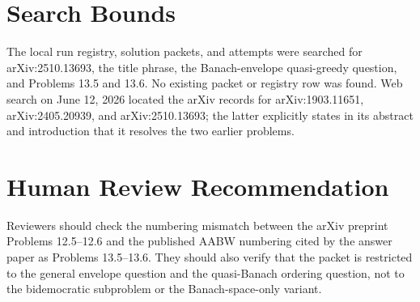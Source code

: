 \documentclass[11pt]{article}
\begin{document}
\section*{Search Bounds}

The local run registry, solution packets, and attempts were searched for
arXiv:2510.13693, the title phrase, the Banach-envelope quasi-greedy question,
and Problems 13.5 and 13.6. No existing packet or registry row was found.
Web search on June 12, 2026 located the arXiv records for arXiv:1903.11651,
arXiv:2405.20939, and arXiv:2510.13693; the latter explicitly states in its
abstract and introduction that it resolves the two earlier problems.

\section*{Human Review Recommendation}

Reviewers should check the numbering mismatch between the arXiv preprint
Problems 12.5--12.6 and the published AABW numbering cited by the answer paper
as Problems 13.5--13.6. They should also verify that the packet is restricted
to the general envelope question and the quasi-Banach ordering question, not
to the bidemocratic subproblem or the Banach-space-only variant.
\end{document}
